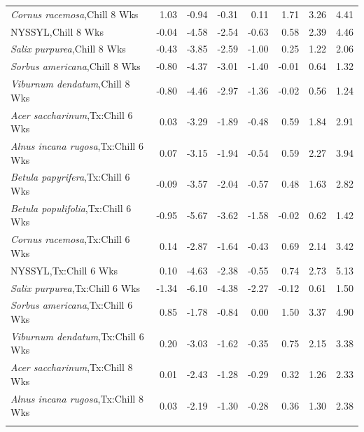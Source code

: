 \documentclass{article}\usepackage[]{graphicx}\usepackage[]{color}
\begin{document}
\begin{longtable}{lrrrrrrr}
  \textit{Cornus racemosa},Chill 8 Wks & 1.03 & -0.94 & -0.31 & 0.11 & 1.71 & 3.26 & 4.41 \\ 
  NYSSYL,Chill 8 Wks & -0.04 & -4.58 & -2.54 & -0.63 & 0.58 & 2.39 & 4.46 \\ 
  \textit{Salix purpurea},Chill 8 Wks & -0.43 & -3.85 & -2.59 & -1.00 & 0.25 & 1.22 & 2.06 \\ 
  \textit{Sorbus americana},Chill 8 Wks & -0.80 & -4.37 & -3.01 & -1.40 & -0.01 & 0.64 & 1.32 \\ 
  \textit{Viburnum dendatum},Chill 8 Wks & -0.80 & -4.46 & -2.97 & -1.36 & -0.02 & 0.56 & 1.24 \\ 
  \textit{Acer saccharinum},Tx:Chill 6 Wks & 0.03 & -3.29 & -1.89 & -0.48 & 0.59 & 1.84 & 2.91 \\ 
  \textit{Alnus incana rugosa},Tx:Chill 6 Wks & 0.07 & -3.15 & -1.94 & -0.54 & 0.59 & 2.27 & 3.94 \\ 
  \textit{Betula papyrifera},Tx:Chill 6 Wks & -0.09 & -3.57 & -2.04 & -0.57 & 0.48 & 1.63 & 2.82 \\ 
  \textit{Betula populifolia},Tx:Chill 6 Wks & -0.95 & -5.67 & -3.62 & -1.58 & -0.02 & 0.62 & 1.42 \\ 
  \textit{Cornus racemosa},Tx:Chill 6 Wks & 0.14 & -2.87 & -1.64 & -0.43 & 0.69 & 2.14 & 3.42 \\ 
  NYSSYL,Tx:Chill 6 Wks & 0.10 & -4.63 & -2.38 & -0.55 & 0.74 & 2.73 & 5.13 \\ 
  \textit{Salix purpurea},Tx:Chill 6 Wks & -1.34 & -6.10 & -4.38 & -2.27 & -0.12 & 0.61 & 1.50 \\ 
  \textit{Sorbus americana},Tx:Chill 6 Wks & 0.85 & -1.78 & -0.84 & 0.00 & 1.50 & 3.37 & 4.90 \\ 
  \textit{Viburnum dendatum},Tx:Chill 6 Wks & 0.20 & -3.03 & -1.62 & -0.35 & 0.75 & 2.15 & 3.38 \\ 
  \textit{Acer saccharinum},Tx:Chill 8 Wks & 0.01 & -2.43 & -1.28 & -0.29 & 0.32 & 1.26 & 2.33 \\ 
  \textit{Alnus incana rugosa},Tx:Chill 8 Wks & 0.03 & -2.19 & -1.30 & -0.28 & 0.36 & 1.30 & 2.38 \\ 
   \hline
\hline
\label{tab:suppmodchl}
\end{longtable}
\end{document}
